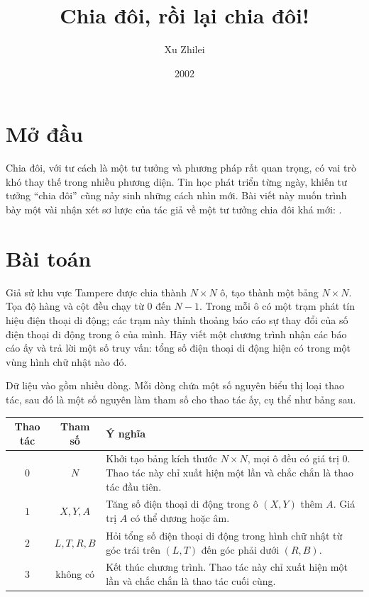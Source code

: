 \documentclass[11pt]{article}
\title{Chia đôi, rồi lại chia đôi!}
\author{Xu Zhilei}
\date{2002}
\begin{document}
\maketitle


\section{Mở đầu}

Chia đôi, với tư cách là một tư tưởng và phương pháp rất quan trọng, có vai
trò khó thay thế trong nhiều phương diện. Tin học phát triển từng ngày, khiến
tư tưởng ``chia đôi'' cũng nảy sinh những cách nhìn mới. Bài viết này muốn
trình bày một vài nhận xét sơ lược của tác giả về một tư tưởng chia đôi khá
mới: .

\section{Bài toán}

Giả sử khu vực Tampere được chia thành \(N\times N\) ô, tạo thành một bảng
\(N\times N\). Tọa độ hàng và cột đều chạy từ \(0\) đến \(N-1\). Trong mỗi ô
có một trạm phát tín hiệu điện thoại di động; các trạm này thỉnh thoảng báo
cáo sự thay đổi của số điện thoại di động trong ô của mình. Hãy viết một
chương trình nhận các báo cáo ấy và trả lời một số truy vấn: tổng số điện
thoại di động hiện có trong một vùng hình chữ nhật nào đó.

Dữ liệu vào gồm nhiều dòng. Mỗi dòng chứa một số nguyên biểu thị loại thao tác,
sau đó là một số nguyên làm tham số cho thao tác ấy, cụ thể như bảng sau.

\begin{center}
\begin{tabular}{c|c|p{}}
\hline
Thao tác & Tham số & Ý nghĩa \\
\hline
\(0\) & \(N\) &
Khởi tạo bảng kích thước \(N\times N\), mọi ô đều có giá trị \(0\).
Thao tác này chỉ xuất hiện một lần và chắc chắn là thao tác đầu tiên. \\
\(1\) & \(X,Y,A\) &
Tăng số điện thoại di động trong ô \((X,Y)\) thêm \(A\). Giá trị \(A\) có thể
dương hoặc âm. \\
\(2\) & \(L,T,R,B\) &
Hỏi tổng số điện thoại di động trong hình chữ nhật từ góc trái trên \((L,T)\)
đến góc phải dưới \((R,B)\). \\
\(3\) & không có &
Kết thúc chương trình. Thao tác này chỉ xuất hiện một lần và chắc chắn là thao
tác cuối cùng. \\
\hline
\end{tabular}
\end{center}
\end{document}
